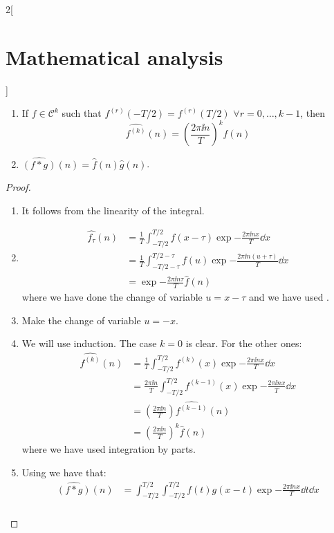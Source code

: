 \documentclass[../../../main_math.tex]{subfiles}
\begin{document}
\begin{multicols}{2}[\section{Mathematical analysis}]
\begin{proposition}
\begin{enumerate}
      \item If $f\in \mathcal{C}^k$ such that $f^{(r)}(-T/2)=f^{(r)}(T/2)$ $\forall r=0,\ldots,k-1$, then $$\widehat{f^{(k)}}(n)=\left(\frac{2\pi\ii n}{T}\right)^k\widehat{f}(n)$$
      \item $\widehat{(f*g)}(n)=\widehat{f}(n)\widehat{g}(n)$.
    \end{enumerate}
  \end{proposition}
  \begin{proof}
    \begin{enumerate}
      \item It follows from the linearity of the integral.
      \item \begin{align*}
              \widehat{f_\tau}(n) & =\frac{1}{T}\int_{-T/2}^{T/2}f(x-\tau)\exp{-\frac{2\pi\ii nx}{T}}\dd{x}             \\
                                  & =\frac{1}{T}\int_{-T/2-\tau}^{T/2-\tau}f(u)\exp{-\frac{2\pi\ii n(u+\tau)}{T}}\dd{x} \\
                                  & =\exp{-\frac{2\pi\ii n\tau}{T}}\widehat{f}(n)
            \end{align*}
            where we have done the change of variable $u=x-\tau$ and we have used .
      \item Make the change of variable $u=-x$.
      \item We will use induction. The case $k=0$ is clear. For the other ones:
            \begin{align*}
              \widehat{f^{(k)}}(n) & =\frac{1}{T}\int_{-T/2}^{T/2} f^{(k)}(x)\exp{-\frac{2\pi\ii nx}{T}}\dd{x}           \\
                                   & =\frac{2\pi\ii n}{T}\int_{-T/2}^{T/2} f^{(k-1)}(x)\exp{-\frac{2\pi\ii nx}{T}}\dd{x} \\
                                   & =\left(\frac{2\pi\ii n}{T}\right)\widehat{f^{(k-1)}}(n)                             \\
                                   & ={\left(\frac{2\pi\ii n}{T}\right)}^k\widehat{f}(n)
            \end{align*}
            where we have used integration by parts.
      \item Using  we have that:
            \begin{align*}
              \widehat{(f*g)}(n) & =\int_{-T/2}^{T/2}\int_{-T/2}^{T/2} f(t)g(x-t)\exp{-\frac{2\pi\ii n x}{T}}\dd{t}\dd{x}              \\

\end{align*}
\end{enumerate}
\end{proof}
\end{multicols}
\end{document}
